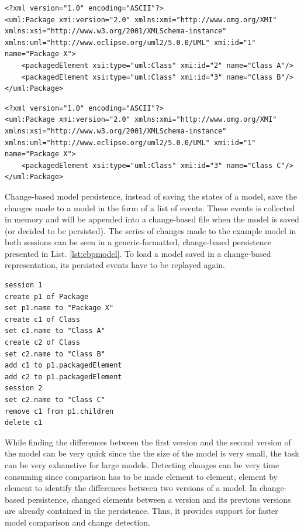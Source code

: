 \documentclass[10pt,conference]{IEEEtran}
\begin{document}
\begin{lstlisting}[style=xmi,caption={The first version of the UML2 example model in XMI format when initially created.},label=lst:xmimodel1]
<?xml version="1.0" encoding="ASCII"?>
<uml:Package xmi:version="2.0" xmlns:xmi="http://www.omg.org/XMI" xmlns:xsi="http://www.w3.org/2001/XMLSchema-instance" xmlns:uml="http://www.eclipse.org/uml2/5.0.0/UML" xmi:id="1" name="Package X">
    <packagedElement xsi:type="uml:Class" xmi:id="2" name="Class A"/>
    <packagedElement xsi:type="uml:Class" xmi:id="3" name="Class B"/>
</uml:Package>
\end{lstlisting}

\begin{lstlisting}[style=xmi,caption={The second version of the UML2 example model in XMI format after ``Class A'' is deleted.},label=lst:xmimodel2]
<?xml version="1.0" encoding="ASCII"?>
<uml:Package xmi:version="2.0" xmlns:xmi="http://www.omg.org/XMI" xmlns:xsi="http://www.w3.org/2001/XMLSchema-instance" xmlns:uml="http://www.eclipse.org/uml2/5.0.0/UML" xmi:id="1" name="Package X">
    <packagedElement xsi:type="uml:Class" xmi:id="3" name="Class C"/>
</uml:Package>
\end{lstlisting}

Change-based model persistence, instead of saving the states of a model, save the changes made to a model in the form of a list of events. These events is collected in memory and will be appended into a change-based file when the model is saved (or decided to be persisted). The series of changes made to the example model in both sessions can be seen in a generic-formatted, change-based persistence presented in List. \ref{lst:cbpmodel}. To load a model saved in a change-based representation, its persisted events have to be replayed again.

\begin{lstlisting}[style=eol,caption={The generic change-based persistence of both versions in List. \ref{lst:xmimodel1} and \ref{lst:xmimodel2}.},label=lst:cbpmodel]
session 1
create p1 of Package
set p1.name to "Package X"  
create c1 of Class
set c1.name to "Class A"
create c2 of Class
set c2.name to "Class B"
add c1 to p1.packagedElement   
add c2 to p1.packagedElement
session 2
set c2.name to "Class C"
remove c1 from p1.children   
delete c1
\end{lstlisting}

While finding the differences between the first version and the second version of the model can be very quick since the the size of the model is very small, the task can be very exhaustive for large models. Detecting changes can be very time consuming since comparison has to be made element to element, element by element to identify the differences between two versions of a model. In change-based persistence, changed elements between a version and its previous versions are already contained in the persistence. Thus, it provides support for faster model comparison and change detection.
\end{document}
